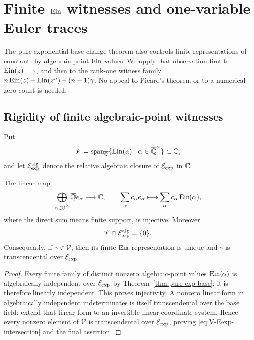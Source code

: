 \section{Finite \texorpdfstring{$\operatorname{Ein}$}{Ein} witnesses and
one-variable Euler traces}
\label{sec:finite-witness-zero-traces}

The pure-exponential base-change theorem also controls finite
representations of constants by algebraic-point \(\operatorname{Ein}\)-values.  We apply
that observation first to \(\operatorname{Ein}(z)-\gamma\), and then to the rank-one
witness family
\(n\operatorname{Ein}(z)-\operatorname{Ein}(z^n)-(n-1)\gamma\).  No appeal to Picard's theorem or to a
numerical zero count is needed.

\subsection{Rigidity of finite algebraic-point witnesses}

Put
\[
 \mathscr V=\operatorname{span}_{\overline{\mathbb Q}}
 \{\operatorname{Ein}(\alpha):\alpha\in\overline{\mathbb Q}^\times\}\subset\mathbb C,
\]
and let \(\mathcal E_{\mathrm{exp}}^{\mathrm{alg}}\) denote the relative algebraic closure of
\(\mathcal E_{\mathrm{exp}}\) in \(\mathbb C\).

\begin{proposition}
\label{prop:finite-ein-witness-rigidity}
The linear map
\[
 \bigoplus_{\alpha\in\overline{\mathbb Q}^\times}\overline{\mathbb Q} e_\alpha
 \longrightarrow\mathbb C,
 \qquad
 \sum_\alpha c_\alpha e_\alpha\longmapsto
 \sum_\alpha c_\alpha\operatorname{Ein}(\alpha),
\]
where the direct sum means finite support, is injective.  Moreover
\begin{equation}\label{eq:V-Eexp-intersection}
 \mathscr V\cap\mathcal E_{\mathrm{exp}}^{\mathrm{alg}}=\{0\}.
\end{equation}
Consequently, if \(\gamma\in\mathscr V\), then its finite
\(\operatorname{Ein}\)-representation is unique and \(\gamma\) is transcendental over
\(\mathcal E_{\mathrm{exp}}\).
\end{proposition}

\begin{proof}
Every finite family of distinct nonzero algebraic-point values
\(\operatorname{Ein}(\alpha)\) is algebraically independent over \(\mathcal E_{\mathrm{exp}}\) by
Theorem~\ref{thm:pure-exp-base}; it is therefore linearly independent.
This proves injectivity.  A nonzero linear form in algebraically independent
indeterminates is itself transcendental over the base field: extend that
linear form to an invertible linear coordinate system.  Hence every nonzero
element of \(\mathscr V\) is transcendental over \(\mathcal E_{\mathrm{exp}}\), proving
\eqref{eq:V-Eexp-intersection} and the final assertion.
\end{proof}

